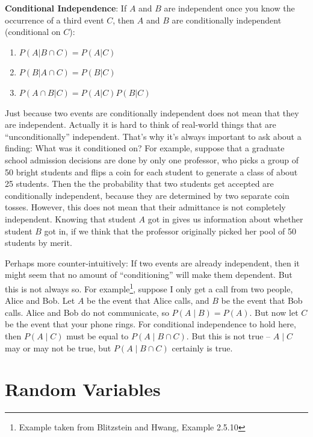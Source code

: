 \documentclass[]{book}
\providecommand{\tightlist}{%
  \setlength{\itemsep}{0pt}\setlength{\parskip}{0pt}}
\let\rmarkdownfootnote\footnote%
\def\footnote{\protect\rmarkdownfootnote}
\theoremstyle{definition}
\theoremstyle{definition}
\theoremstyle{definition}
\theoremstyle{remark}
\begin{document}
\textbf{Conditional Independence}: If \(A\) and \(B\) are independent once you know the occurrence of a third event \(C\), then \(A\) and \(B\) are conditionally independent (conditional on \(C\)):

\begin{enumerate}
\def\labelenumi{\arabic{enumi}.}
\tightlist
\item
  \(P(A|B \cap C)=P(A|C)\)
\item
  \(P(B|A \cap C)=P(B|C)\)
\item
  \(P(A\cap B|C)=P(A|C)P(B|C)\)
\end{enumerate}

Just because two events are conditionally independent does not mean that they are independent. Actually it is hard to think of real-world things that are ``unconditionally'' independent. That's why it's always important to ask about a finding: What was it conditioned on? For example, suppose that a graduate school admission decisions are done by only one professor, who picks a group of 50 bright students and flips a coin for each student to generate a class of about 25 students. Then the the probability that two students get accepted are conditionally independent, because they are determined by two separate coin tosses. However, this does not mean that their admittance is not completely independent. Knowing that student \(A\) got in gives us information about whether student \(B\) got in, if we think that the professor originally picked her pool of 50 students by merit.

Perhaps more counter-intuitively: If two events are already independent, then it might seem that no amount of ``conditioning'' will make them dependent. But this is not always so. For example\footnote{Example taken from Blitzstein and Hwang, Example 2.5.10}, suppose I only get a call from two people, Alice and Bob. Let \(A\) be the event that Alice calls, and \(B\) be the event that Bob calls. Alice and Bob do not communicate, so \(P(A \mid B) = P(A).\) But now let \(C\) be the event that your phone rings. For conditional independence to hold here, then \(P(A \mid C)\) must be equal to \(P(A \mid B \cap C).\) But this is not true -- \(A \mid C\) may or may not be true, but \(P(A \mid B \cap C)\) certainly is true.

\hypertarget{random-variables}{%
\section{Random Variables}\label{random-variables}}
\end{document}
